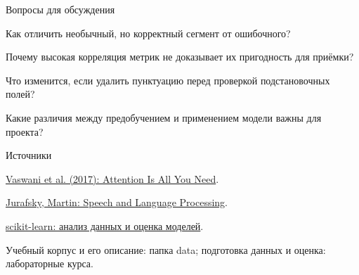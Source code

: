 \documentclass[aspectratio=169,12pt]{beamer}
\begin{document}
\begin{frame}{Вопросы для обсуждения}
\color{ink}
{\small Как отличить необычный, но корректный сегмент от ошибочного?
\par\vspace{0.6em}Почему высокая корреляция метрик не доказывает их пригодность для приёмки?
\par\vspace{0.6em}Что изменится, если удалить пунктуацию перед проверкой подстановочных полей?
\par\vspace{0.6em}Какие различия между предобучением и применением модели важны для проекта?}
\end{frame}

\begin{frame}{Источники}
\color{ink}
{\small \href{https://arxiv.org/abs/1706.03762}{Vaswani et al. (2017): Attention Is All You Need}.
\par\vspace{0.6em}\href{https://web.stanford.edu/~jurafsky/slp3/}{Jurafsky, Martin: Speech and Language Processing}.
\par\vspace{0.6em}\href{https://scikit-learn.org/stable/user_guide.html}{scikit-learn: анализ данных и оценка моделей}.
\par\vspace{0.6em}Учебный корпус и его описание: папка data; подготовка данных и оценка: лабораторные курса.}
\end{frame}
\end{document}
